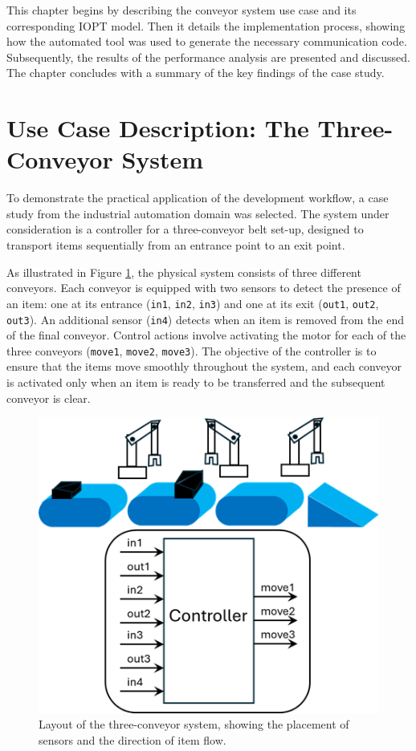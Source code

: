 This chapter begins by describing the conveyor system use case and its corresponding IOPT model. Then it details the implementation process, showing how the automated tool was used to generate the necessary communication code. Subsequently, the results of the performance analysis are presented and discussed. The chapter concludes with a summary of the key findings of the case study.


\section{Use Case Description: The Three-Conveyor System}
\label{sec:use_case_description}

To demonstrate the practical application of the development workflow, a case study from the industrial automation domain was selected. The system under consideration is a controller for a three-conveyor belt set-up, designed to transport items sequentially from an entrance point to an exit point.

As illustrated in Figure \ref{fig:conveyor_layout}, the physical system consists of three different conveyors. Each conveyor is equipped with two sensors to detect the presence of an item: one at its entrance (\texttt{in1}, \texttt{in2}, \texttt{in3}) and one at its exit (\texttt{out1}, \texttt{out2}, \texttt{out3}). An additional sensor (\texttt{in4}) detects when an item is removed from the end of the final conveyor. Control actions involve activating the motor for each of the three conveyors (\texttt{move1}, \texttt{move2}, \texttt{move3}). The objective of the controller is to ensure that the items move smoothly throughout the system, and each conveyor is activated only when an item is ready to be transferred and the subsequent conveyor is clear.

\begin{figure}[htb]
    \centering
    \includegraphics[width=0.6\columnwidth]{Chapters/Figures/layout.png}
    \caption{Layout of the three-conveyor system, showing the placement of sensors and the direction of item flow.}
    \label{fig:conveyor_layout}
\end{figure}

